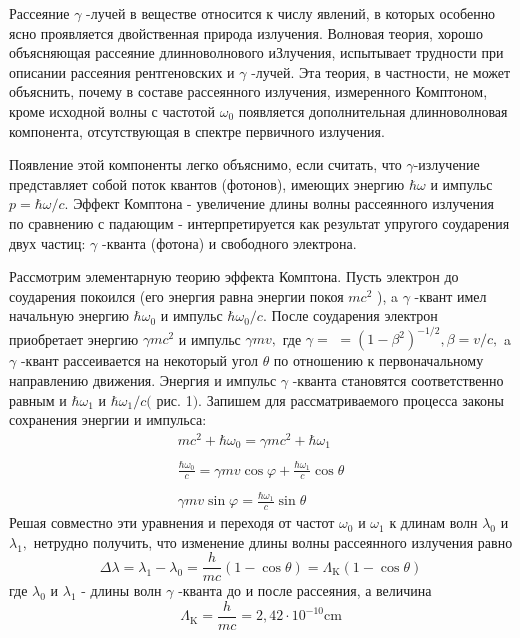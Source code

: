 Рассеяние $\gamma$ -лучей в веществе относится к числу явлений, в которых
особенно ясно проявляется двойственная природа излучения. Волновая теория,
хорошо объясняющая рассеяние длинноволнового иЗлучения, испытывает трудности при
описании рассеяния рентгеновских и $\gamma$ -лучей. Эта теория, в частности, не
может объяснить, почему в составе рассеянного излучения, измеренного Комптоном,
кроме исходной волны с частотой $\omega_{0}$ появляется дополнительная
длинноволновая компонента, отсутствующая в спектре первичного излучения.

Появление этой компоненты легко объяснимо, если считать, что $\gamma$-излучение
представляет собой поток квантов (фотонов), имеющих энергию $\hbar \omega$ и
импульс $p=\hbar \omega / c .$ Эффект Комптона - увеличение длины волны
рассеянного излучения по сравнению с падающим - интерпретируется как результат
упругого соударения двух частиц: $\gamma$ -кванта (фотона) и свободного
электрона.

Рассмотрим элементарную теорию эффекта Комптона. Пусть электрон до соударения
покоился (его энергия равна энергии покоя $m c^{2}$ ), a $\gamma$ -квант имел
начальную энергию $\hbar \omega_{0}$ и импульс $\hbar \omega_{0} / c .$ После
соударения электрон приобретает энергию $\gamma m c^{2}$ и импульс $\gamma m v,$
где $\gamma=$ $=\left(1-\beta^{2}\right)^{-1 / 2}, \beta=v / c,$ a $\gamma$
-квант рассеивается на некоторый угол $\theta$ по отношению к первоначальному
направлению движения. Энергия и импульс $\gamma$ -кванта становятся
соответственно равным и $\hbar \omega_{1}$ и $\hbar \omega_{1} / c($ рис. 1$)$.
Запишем для рассматриваемого процесса законы сохранения энергии и импульса:
$$
  \begin{array}{c}
    m c^{2}+\hbar \omega_{0}=\gamma m c^{2}+\hbar \omega_{1}                                  \\
    \\
    \frac{\hbar \omega_{0}}{c}=\gamma m v \cos \varphi+\frac{\hbar \omega_{1}}{c} \cos \theta \\
    \\
    \gamma m v \sin \varphi=\frac{\hbar \omega_{1}}{c} \sin \theta
  \end{array}
$$
Решая совместно эти уравнения и переходя от частот $\omega_{0}$ и $\omega_{1}$ к
длинам волн $\lambda_{0}$ и $\lambda_{1},$ нетрудно получить, что изменение
длины волны рассеянного излучения равно
\begin{equation}\label{DeltaLambda}
  \Delta \lambda=\lambda_{1}-\lambda_{0}=\frac{h}{m c}(1-\cos \theta)=\Lambda_{\mathrm{K}}(1-\cos \theta)
\end{equation}
где $\lambda_{0}$ и $\lambda_{1}$ - длины волн $\gamma$ -кванта до и после
рассеяния, а величина
$$
  \Lambda_{\mathrm{K}}=\frac{h}{m c}=2,42 \cdot 10^{-10} \mathrm{cm}
$$

